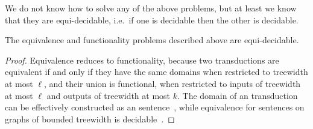 We do not know how to solve any of the above problems, but at least we know that they are equi-decidable, i.e.~if one is decidable then the other is decidable. 

\begin{fact}\label{fact:equi-decidable}
    The equivalence and functionality problems described above are equi-decidable.
\end{fact}
\begin{proof}
    Equivalence reduces to functionality, because two transductions are  equivalent if and only if they have the same domains when restricted to treewidth at most $\ell$, and their union is  functional, when restricted to inputs of treewidth at most $\ell$ and outputs of treewidth at most $k$.  The domain of an \mso transduction can be effectively constructed as an \mso sentence~\cite[Backwards Translation Theorem]{courcelleGraphStructureMonadic2012}, while equivalence for \mso sentences on graphs of bounded treewidth is decidable~\cite[Theorem 5.80]{courcelleGraphStructureMonadic2012}.


\end{proof}
